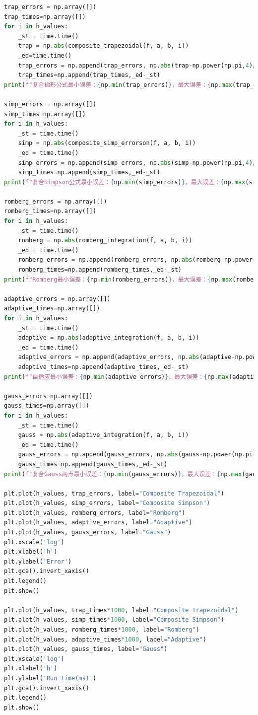 \documentclass[a4paper,11pt,notitlepage]{article}
\begin{document}
\begin{lstlisting}[language=Python,caption={Fifth Chapter 2.py},label={code2.1}]
trap_errors = np.array([])
trap_times=np.array([])
for i in h_values:
    _st = time.time()
    trap = np.abs(composite_trapezoidal(f, a, b, i))
    _ed=time.time()
    trap_errors = np.append(trap_errors, np.abs(trap-np.power(np.pi,4)/15))
    trap_times=np.append(trap_times,_ed-_st)
print(f"复合梯形公式最小误差：{np.min(trap_errors)}，最大误差：{np.max(trap_errors)}，最多用时（ms）：{1000*max(trap_times)}")

simp_errors = np.array([])
simp_times=np.array([])
for i in h_values:
    _st = time.time()
    simp = np.abs(composite_simp_errorson(f, a, b, i))
    _ed = time.time()
    simp_errors = np.append(simp_errors, np.abs(simp-np.power(np.pi,4)/15))
    simp_times=np.append(simp_times,_ed-_st)
print(f"复合Simpson公式最小误差：{np.min(simp_errors)}，最大误差：{np.max(simp_errors)}，最多用时（ms）：{1000*max(simp_times)}")

romberg_errors = np.array([])
romberg_times=np.array([])
for i in h_values:
    _st = time.time()
    romberg = np.abs(romberg_integration(f, a, b, i))
    _ed = time.time()
    romberg_errors = np.append(romberg_errors, np.abs(romberg-np.power(np.pi,4)/15))
    romberg_times=np.append(romberg_times,_ed-_st)
print(f"Romberg最小误差：{np.min(romberg_errors)}，最大误差：{np.max(romberg_errors)}，最多用时（ms）：{1000*max(romberg_times)}")

adaptive_errors = np.array([])
adaptive_times=np.array([])
for i in h_values:
    _st = time.time()
    adaptive = np.abs(adaptive_integration(f, a, b, i))
    _ed = time.time()
    adaptive_errors = np.append(adaptive_errors, np.abs(adaptive-np.power(np.pi,4)/15))
    adaptive_times=np.append(adaptive_times,_ed-_st)
print(f"自适应最小误差：{np.min(adaptive_errors)}，最大误差：{np.max(adaptive_errors)}，最多用时（ms）：{1000*max(adaptive_times)}")

gauss_errors=np.array([])
gauss_times=np.array([])
for i in h_values:
    _st = time.time()
    gauss = np.abs(adaptive_integration(f, a, b, i))
    _ed = time.time()
    gauss_errors = np.append(gauss_errors, np.abs(gauss-np.power(np.pi,4)/15))
    gauss_times=np.append(gauss_times,_ed-_st)
print(f"复合Gauss两点最小误差：{np.min(gauss_errors)}，最大误差：{np.max(gauss_errors)}，最多用时（ms）：{1000*max(gauss_times)}")

plt.plot(h_values, trap_errors, label="Composite Trapezoidal")
plt.plot(h_values, simp_errors, label="Composite Simpson")
plt.plot(h_values, romberg_errors, label="Romberg")
plt.plot(h_values, adaptive_errors, label="Adaptive")
plt.plot(h_values, gauss_errors, label="Gauss")
plt.xscale('log')
plt.xlabel('h')
plt.ylabel('Error')
plt.gca().invert_xaxis()
plt.legend()
plt.show()

plt.plot(h_values, trap_times*1000, label="Composite Trapezoidal")
plt.plot(h_values, simp_times*1000, label="Composite Simpson")
plt.plot(h_values, romberg_times*1000, label="Romberg")
plt.plot(h_values, adaptive_times*1000, label="Adaptive")
plt.plot(h_values, gauss_times, label="Gauss")
plt.xscale('log')
plt.xlabel('h')
plt.ylabel('Run time(ms)')
plt.gca().invert_xaxis()
plt.legend()
plt.show()
\end{lstlisting}
\end{document}

